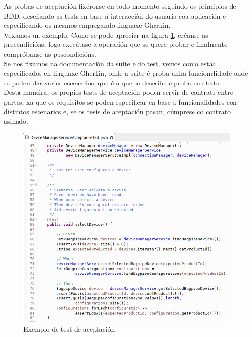  As probas de aceptación fixéronse en todo momento seguindo os principios de
 BDD, deseñando os tests en base á interacción do usuario coa aplicación e
 especificando os mesmos empregando linguaxe Gherkin. \\
 
 Vexamos un exemplo. Como se pode apreciar na figura \ref{figura:TestAceptacion},
 créanse as precondicións, logo execútase a operación que se quere probar e
 finalmente compróbanse as poscondicións. \\
 
 Se nos fixamos na documentación da suite e do test, vemos como están
 especificados en linguaxe Gherkin, onde a suite é proba unha funcionalidade
 onde se poden dar varios escenarios, que é o que se describe e proba nos
 tests. \\
 
 Desta maneira, os propios tests de aceptación poden servir de contrato entre
 partes, xa que os requisitos se poden especificar en base a funcionalidades con
 distintos escenarios e, se os tests de aceptación pasan, cúmprese co
 contrato asinado. \\
  
 \begin{figure}[htbp]
  \centering
  \includegraphics[scale=0.8,keepaspectratio=true]{./imagenes/test-aceptacion.png}
  \caption{Exemplo de test de aceptación}
  \label{figura:TestAceptacion}
 \end{figure}
 
